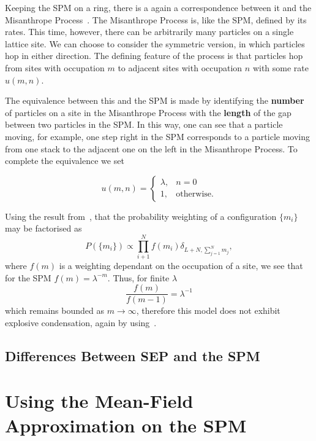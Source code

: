 Keeping the SPM on a ring, there is a again a correspondence between it and the Misanthrope Process~\cite{evansWaclaw2014}. The Misanthrope Process is, like the SPM, defined by its rates. This time, however, there can be arbitrarily many particles
on a single lattice site. We can choose to consider the symmetric version, in which particles hop in either direction. The defining feature of the process is that particles hop from sites with occupation $m$ to adjacent sites with occupation
$n$ with some rate $u(m, n)$.

The equivalence between this and the SPM is made by identifying the \textbf{number} of particles on a site in the Misanthrope Process with the \textbf{length} of the gap between two particles in the SPM. In this way, one can see that a particle
moving, for example, one step right in the SPM corresponds to a particle moving from one stack to the adjacent one on the left in the Misanthrope Process. To complete the equivalence we set


\[
  u(m, n) =
  \begin{cases}
                                   \lambda, & n=0 \\
                                   1, & \text{otherwise.} 
  \end{cases}
\]

Using the result from~\cite{evansWaclaw2014}, that the probability weighting of a configuration $\{m_i\}$ may be factorised as
\begin{equation}
 P(\{m_i\}) \propto \prod_{i+1}^N f(m_i) \delta_{L+N, \sum_{j=1}^N m_j},
\end{equation}
where $f(m)$ is a weighting dependant on the occupation of a site,  we see that for the SPM $f(m) = \lambda^{-m}$. Thus, for finite $\lambda$ 
\begin{equation}
 \frac{f(m)}{f(m-1)} = \lambda^{-1}
\end{equation}
which remains bounded as $m \rightarrow \infty$, therefore this model does not exhibit explosive condensation, again by using~\cite{evansWaclaw2014}.

\subsection{Differences Between SEP and the SPM}

\section{Using the Mean-Field Approximation on the SPM}

